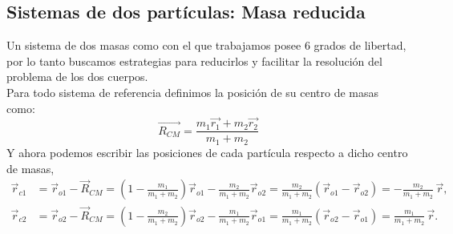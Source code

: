 \documentclass[openany]{book}
\theoremstyle{ucostyle}
\begin{document}
\subsection{Sistemas de dos partículas: Masa reducida}
Un sistema de dos masas como con el que trabajamos posee 6 grados de libertad, por lo tanto buscamos estrategias para reducirlos y facilitar la resolución del problema de los dos cuerpos. 
\\

Para todo sistema de referencia definimos la posición de su centro de masas como: 
\begin{equation}
\vec{R_{CM}}=\frac{m_1\vec{r_1}+m_2\vec{r_2}}{m_1+m_2}
\end{equation}
Y ahora podemos escribir las posiciones de cada partícula respecto a dicho centro de masas, 
\begin{align*}
    \vec{r}_{c1} &= \vec{r}_{o1} - \vec{R}_{CM}
= \left(1 - \frac{m_1}{m_1 + m_2}\right)\vec{r}_{o1}
- \frac{m_2}{m_1 + m_2}\vec{r}_{o2}
= \frac{m_2}{m_1 + m_2}(\vec{r}_{o1} - \vec{r}_{o2})
= -\frac{m_2}{m_1 + m_2}\,\vec{r},
\\[1em]
\vec{r}_{c2} &= \vec{r}_{o2} - \vec{R}_{CM}
= \left(1 - \frac{m_2}{m_1 + m_2}\right)\vec{r}_{o2}
- \frac{m_1}{m_1 + m_2}\vec{r}_{o1}
= \frac{m_1}{m_1 + m_2}(\vec{r}_{o2} - \vec{r}_{o1})
= \frac{m_1}{m_1 + m_2}\,\vec{r}.
\end{align*}
\end{document}
